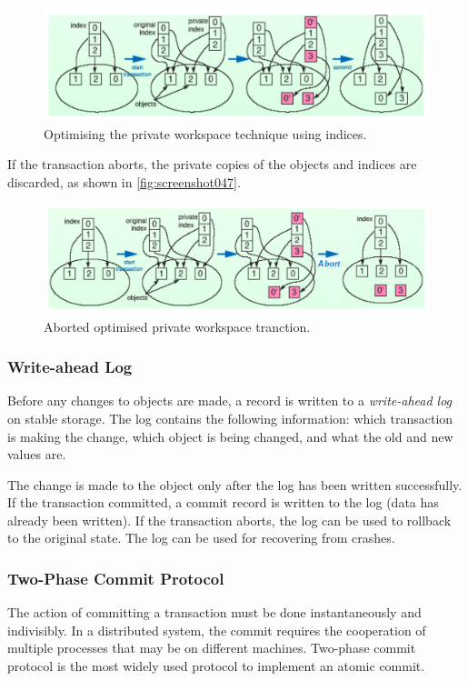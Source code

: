 \begin{figure}
\centering
\includegraphics[width=0.7\linewidth]{figures/screenshot046}
\caption{Optimising the private workspace technique using indices.}
\label{fig:screenshot046}
\end{figure}

If the transaction aborts, the private copies of the objects and indices are discarded, as shown in \autoref{fig:screenshot047}.
\begin{figure}
\centering
\includegraphics[width=0.7\linewidth]{figures/screenshot047}
\caption{Aborted optimised private workspace tranction.}
\label{fig:screenshot047}
\end{figure}

\subsubsection{Write-ahead Log} 
Before any changes to objects are made, a record is written to a \textit{write-ahead log} on stable storage. The log contains the following information: which transaction is making the change, which object is being changed, and what the old and new values are. 

The change is made to the object only after the log has been written successfully. If the transaction committed, a commit record is written to the log (data has already been written). If the transaction aborts, the log can be used to rollback to the original state. The log can be used for recovering from crashes. 

\subsubsection{Two-Phase Commit Protocol}
The action of committing a transaction must be done instantaneously and indivisibly. In a distributed system, the commit requires the cooperation of multiple processes that may be on different machines. Two-phase commit protocol is the most widely used protocol to implement an atomic commit. 

